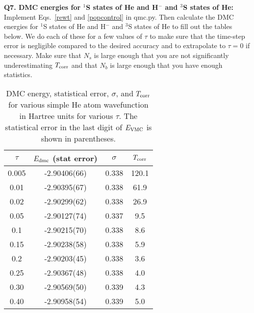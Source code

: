 \documentclass[11pt,aps,prb,amsmath,amssymb,superscriptaddress,notitlepage]{revtex4-1}
\def\Tcorr{T_{\rm corr}}
\providecommand{\tabularnewline}{\\}
\begin{document}
{\color{blue}
\textbf{Q7. DMC energies for $^1$S states of He and H$^-$ and $^3$S states of He:}\\
Implement Eqs.~\ref{rewt} and \ref{popcontrol} in qmc.py.
Then calculate the DMC energies for $^1$S states of He and H$^-$ and $^3$S states of He to fill out the
tables below.  We do each of these for a few values of $\tau$ to make sure that the time-step error is
negligible compared to the desired accuracy and to extrapolate to $\tau=0$ if necessary.
Make sure that $N_s$ is large enough that you are not significantly underestimating $\Tcorr$
and that $N_b$ is large enough that you have enough statistics.

\begin{table}[H]
\begin{center}
\color{blue}
\caption{DMC energy, statistical error, $\sigma$, and $\Tcorr$ for various simple He atom wavefunction
in Hartree units for various $\tau$. The statistical error in the last digit of $E_{\rm VMC}$ is shown in parentheses.}
\label{He_DMC}
\begin{tabular}{|c|c|c|c|}
\hline 
$\tau$ & \multicolumn{1}{c}{$E_{\rm dmc}$ (stat error)} | & $\sigma$ & $\Tcorr$ \tabularnewline
\hline 
0.005& -2.90406(66) & 0.338 & 120.1\tabularnewline
0.01 & -2.90395(67) & 0.338 & 61.9\tabularnewline
0.02 & -2.90299(62) & 0.338 & 26.9\tabularnewline
0.05 & -2.90127(74) & 0.337 & 9.5 \tabularnewline
0.1  & -2.90215(70) & 0.338 & 8.6 \tabularnewline
0.15 & -2.90238(58) & 0.338 & 5.9 \tabularnewline
0.2  & -2.90203(45) & 0.338 & 3.6 \tabularnewline
0.25 & -2.90367(48) & 0.338 & 4.0 \tabularnewline
0.30 & -2.90569(50) & 0.339 & 4.3 \tabularnewline
0.40 & -2.90958(54) & 0.339 & 5.0 \tabularnewline
\hline 
\end{tabular}\\
\end{center}
\end{table}


}
\end{document}

